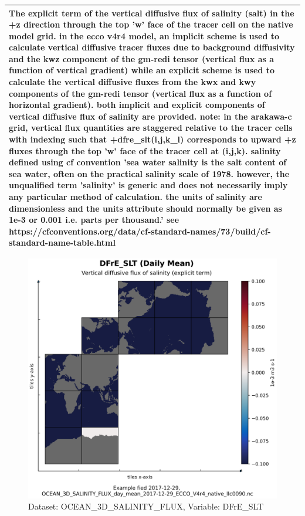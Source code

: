 \begin{longtable}{|m{}|m{}|m{}|m{}|}
\multicolumn{4}{|p{1\textwidth}|}{The explicit term of the vertical diffusive flux of salinity (salt) in the +z direction through the top 'w' face of the tracer cell on the native model grid. in the ecco v4r4 model, an implicit scheme is used to calculate vertical diffusive tracer fluxes due to background diffusivity and the kwz component of the gm-redi tensor (vertical flux as a function of vertical gradient) while an explicit scheme is used to calculate the vertical diffusive fluxes from the kwx and kwy components of the gm-redi tensor (vertical flux as a function of horizontal gradient). both implicit and explicit components of vertical diffusive flux of salinity are provided. note: in the arakawa-c grid, vertical flux quantities are staggered relative to the tracer cells with indexing such that +dfre\_slt(i,j,k\_l) corresponds to upward +z fluxes through the top 'w' face of the tracer cell at (i,j,k). salinity defined using cf convention 'sea water salinity is the salt content of sea water, often on the practical salinity scale of 1978. however, the unqualified term 'salinity' is generic and does not necessarily imply any particular method of calculation. the units of salinity are dimensionless and the units attribute should normally be given as 1e-3 or 0.001 i.e. parts per thousand.' see https://cfconventions.org/data/cf-standard-names/73/build/cf-standard-name-table.html} \\ \hline
\end{longtable}

\begin{figure}[H]
\centering
\includegraphics[scale=0.55]{../images/plots/native_plots/Ocean_Three-Dimensional_Salinity_Fluxes/DFrE_SLT.png}
\caption{Dataset: OCEAN\_3D\_SALINITY\_FLUX, Variable: DFrE\_SLT}
\label{tab:table-OCEAN_3D_SALINITY_FLUX_DFrE_SLT-Plot}
\end{figure}
\pagebreak
